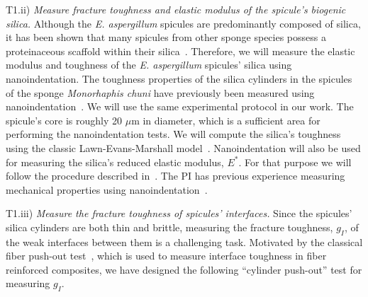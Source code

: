 \documentclass[10pt,letterpaper]{article}
\begin{document}
      {\selectfont T1.ii}) \textit{Measure fracture toughness and elastic modulus of the spicule's biogenic silica.}
        Although the \textit{E. aspergillum} spicules are predominantly composed of silica, it has been shown that many spicules from other sponge species  possess a proteinaceous scaffold within their silica~\cite{wang2010morphology, weaver2003nanostructural}.
        Therefore, we will measure the elastic modulus and toughness of the \textit{E. aspergillum} spicules' silica using nanoindentation. The toughness properties of the silica cylinders in the spicules of the sponge \textit{Monorhaphis chuni} have previously been measured using nanoindentation~\cite{woesz2006micromechanical, Miserez:2008wf}. We will use the same experimental protocol in our work.
        The spicule's core is roughly 20 $\mu$m in diameter, which is a sufficient area for performing the nanoindentation tests. We will compute the silica's toughness using the classic Lawn-Evans-Marshall model~\cite{lawn1975indentation, evans1976fracture}. Nanoindentation will also be used for measuring the silica's reduced elastic modulus, $E^*$. For that purpose we will follow the procedure described in~\cite{oliver1992improved}. The PI has previous experience measuring mechanical properties using nanoindentation~\cite{kesari2010role, kesari2011mechanics}.

      {\selectfont T1.iii}) \textit{Measure the fracture toughness of spicules' interfaces.}
        Since the spicules' silica cylinders are both thin and brittle, measuring the fracture toughness, $g_{I}$, of the weak interfaces between them is a challenging task. Motivated by the classical fiber push-out test~\cite{marshall1984indentation}, which is used to measure interface toughness in fiber reinforced composites, we have designed the following ``cylinder push-out'' test for measuring $g_{I}$.
\end{document}
